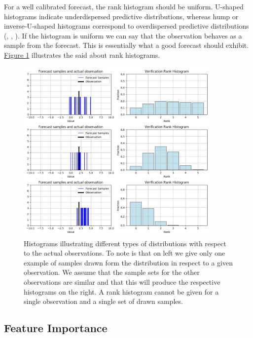 \documentclass[12pt,a4paper,twoside]{scrartcl}
\numberwithin{equation}{section}
\newcommand{\reffig}[1]{\hyperref[#1]{Figure \ref*{#1}}}
\begin{document}
For a well calibrated forecast, the rank histogram should be uniform. U-shaped histograms indicate underdispersed predictive distributions, whereas hump or inverse-U-shaped histograms correspond to overdispersed predictive distributions (\cite{gneiting2014}, \cite{diebold1998}, \cite{hamill2001}). If the histogram is uniform we can say that the observation behaves as a sample from the forecast. This is essentially what a good forecast should exhibit. \reffig{fig:rank-hist} illustrates the said about rank histograms.

\begin{center}
  \begin{figure}[htbp]
    \label{fig:rank-hist}
    \centering
    \includegraphics[height=0.75\textwidth, width=0.9\textwidth]{figures/verification_histogram.png}
    \caption[Rank Histogram Example]{Histograms illustrating different types of distributions with respect to the actual observations. To note is that on left we give only one example of samples drawn form the distribution in respect to a given observation. We assume that the sample sets for the other observations are similar and that this will produce the respective histograms on the right. A rank histogram cannot be given for a single observation and a single set of drawn samples.}
  \end{figure}
\end{center}
\subsection{Feature Importance}\label{sec:feature-importance}
\end{document}
